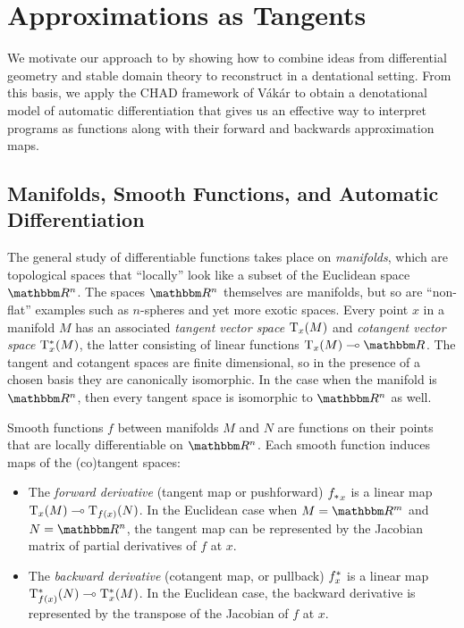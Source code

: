 \section{Approximations as Tangents}

We motivate our approach to \GPS by showing how to combine ideas from differential geometry and stable domain theory to reconstruct \GPS in a dentational setting. From this basis, we apply the CHAD framework of V{\'a}k{\'a}r \etal to obtain a denotational model of automatic differentiation that gives us an effective way to interpret programs as functions along with their forward and backwards approximation maps.

\subsection{Manifolds, Smooth Functions, and Automatic Differentiation}


The general study of differentiable functions takes place on \emph{manifolds}, which are topological spaces that ``locally'' look like a subset of the Euclidean space $\RR^n$. The spaces $\RR^n$ themselves are manifolds, but so are ``non-flat'' examples such as $n$-spheres and yet more exotic spaces. Every point $x$ in a manifold $M$ has an associated \emph{tangent vector space} $\mathrm{T}_x(M)$ and \emph{cotangent vector space} $\mathrm{T}^*_x(M)$, the latter consisting of linear functions $\tangents_x(M) \linearto \RR$. The tangent and cotangent spaces are finite dimensional, so in the presence of a chosen basis they are canonically isomorphic. In the case when the manifold is $\RR^n$, then every tangent space is isomorphic to $\RR^n$ as well.

Smooth functions $f$ between manifolds $M$ and $N$ are functions on their points that are locally differentiable on $\RR^n$. Each smooth function induces maps of the (co)tangent spaces:
\begin{itemize}
\item The \emph{forward derivative} (tangent map or pushforward) ${f_{*}}_x$ is a linear map $\mathrm{T}_x(M) \multimap \mathrm{T}_{f(x)}(N)$. In the Euclidean case when $M = \RR^m$ and $N = \RR^n$, the tangent map can be represented by the Jacobian matrix of partial derivatives of $f$ at $x$.
\item The \emph{backward derivative} (cotangent map, or pullback) $f^{*}_x$ is a linear map $\mathrm{T}^*_{f(x)}(N) \multimap \mathrm{T}^*_x(M)$. In the Euclidean case, the backward derivative is represented by the transpose of the Jacobian of $f$ at $x$.
\end{itemize}

